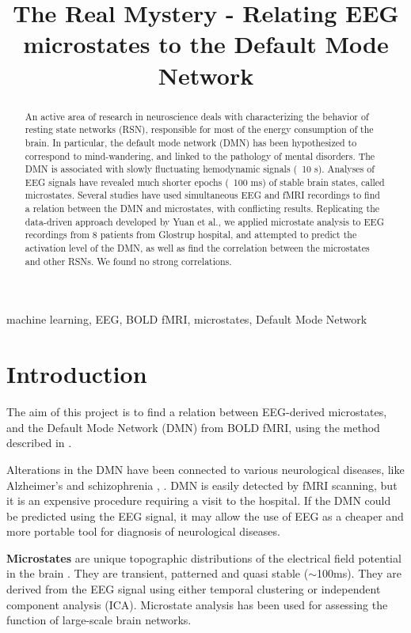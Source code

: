 \documentclass{article}
\title{The Real Mystery - Relating EEG microstates to the Default Mode Network}
\begin{document}
%

\maketitle
%
\begin{abstract}An active area of research in neuroscience deals with characterizing the behavior of resting state networks (RSN), responsible for most of the energy consumption of the brain. In particular, the default mode network (DMN) has been hypothesized to correspond to mind-wandering, and linked to the pathology of mental disorders. The DMN is associated with slowly fluctuating hemodynamic signals (~10 s). Analyses of EEG signals have revealed much shorter epochs (~100 ms) of stable brain states, called microstates. Several studies have used simultaneous EEG and fMRI recordings to find a relation between the DMN and microstates, with conflicting results. Replicating the data-driven approach developed by Yuan et al., we applied microstate analysis to EEG recordings from 8 patients from Glostrup hospital, and attempted to predict the activation level of the DMN, as well as find the correlation between the microstates and other RSNs. We found no strong correlations.

\end{abstract}
%
\begin{keywords}
machine learning, EEG, BOLD fMRI, microstates, Default Mode Network
\end{keywords}
%
\section{Introduction}The aim of this project is to find a relation between EEG-derived microstates, and the Default Mode Network (DMN) from BOLD fMRI, using the method described in \cite{Yuan20122062}.

Alterations in the DMN have been connected to various neurological diseases, like Alzheimer’s and schizophrenia \cite{Yuan20122062}, \cite{Khanna2015105}. DMN is easily detected by fMRI scanning, but it is an expensive procedure requiring a visit to the hospital. If the DMN could be predicted using the EEG signal, it may allow the use of EEG as a cheaper and more portable tool for diagnosis of neurological diseases.

\textbf{Microstates} are unique topographic distributions of the electrical field potential in the brain  \cite{Khanna2015105}. They are transient, patterned and quasi stable ($\sim$100ms). They are derived from the EEG signal using either temporal clustering or independent component analysis (ICA). Microstate analysis has been used for assessing the function of large-scale brain networks.
\end{document}
